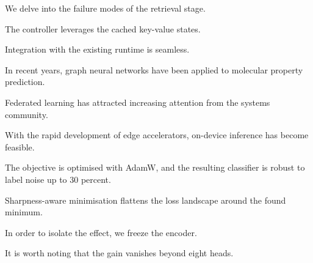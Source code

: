
We delve into the failure modes of the retrieval stage.

The controller leverages the cached key-value states.

Integration with the existing runtime is seamless.

In recent years, graph neural networks have been applied to molecular property prediction.

Federated learning has attracted increasing attention from the systems community.

With the rapid development of edge accelerators, on-device inference has become feasible.

The objective is optimised with AdamW, and the resulting classifier is robust to label noise up to 30 percent.

Sharpness-aware minimisation flattens the loss landscape around the found minimum.

In order to isolate the effect, we freeze the encoder.

It is worth noting that the gain vanishes beyond eight heads.

